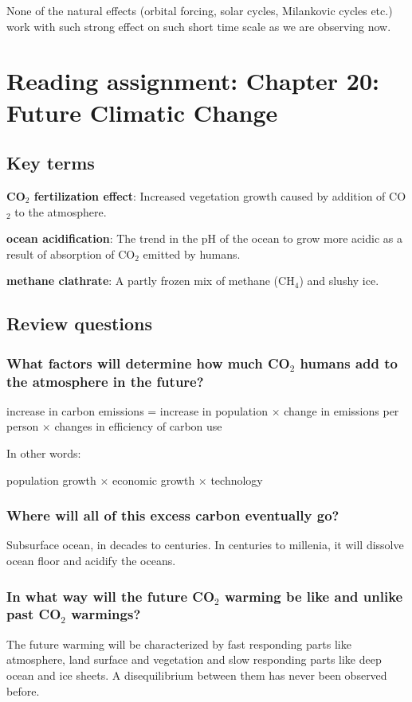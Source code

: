 None of the natural effects (orbital forcing, solar cycles, Milankovic cycles
etc.) work with such strong effect on such short time scale as we are observing
now.

\section{Reading assignment: Chapter 20: Future Climatic Change}

\subsection{Key terms}

\textbf{CO$_2$ fertilization effect}: Increased vegetation growth caused by
addition of CO$_2$ to the atmosphere.

\textbf{ocean acidification}: The trend in the pH of the ocean to grow more
acidic as a result of absorption of CO$_2$ emitted by humans.

\textbf{methane clathrate}: A partly frozen mix of methane (CH$_4$) and slushy
ice.

\subsection{Review questions}

\subsubsection{What factors will determine how much CO$_2$ humans add to the
atmosphere in the future?}

increase in carbon emissions = increase in population $\times$ change in
emissions per person $\times$ changes in efficiency of carbon use

In other words:

population growth $\times$ economic growth $\times$ technology

\subsubsection{Where will all of this excess carbon eventually go?}

Subsurface ocean, in decades to centuries. In centuries to millenia, it will
dissolve ocean floor and acidify the oceans.

\subsubsection{In what way will the future CO$_2$ warming be like and unlike
past CO$_2$ warmings?}
The future warming will be characterized by fast responding parts like
atmosphere, land surface and vegetation and slow responding parts like deep
ocean and ice sheets. A disequilibrium between them has never been observed
before.

